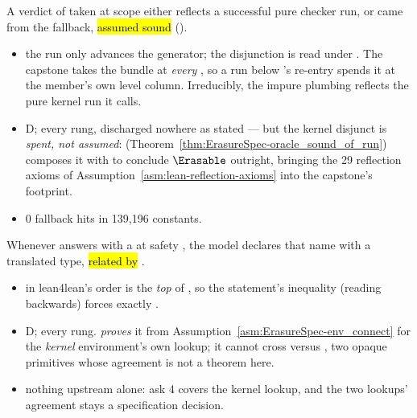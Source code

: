 \begin{assumption}
\label{asm:ErasureSpec-oracle_refl}
\leanok
{}
\stAssumed{}  A  verdict of  taken at scope
 either reflects a successful pure checker run, or came from the
 fallback, \hl{assumed sound} ().
\begin{itemize}
\item {} the run only advances the generator; the disjunction is read under
. The capstone takes the bundle at \emph{every} , so a run
below 's re-entry spends it at the member's own level column. Irreducibly, the
impure  plumbing reflects the pure kernel run it calls.
\item {} D;  every rung, discharged nowhere as stated --- but the kernel
disjunct is \emph{spent, not assumed}: 
(Theorem~\ref{thm:ErasureSpec-oracle_sound_of_run}) composes it with
 to conclude $\Erasable$ outright, bringing the 29
reflection axioms of Assumption~\ref{asm:lean-reflection-axioms} into the capstone's footprint.
\item {} 0 fallback hits in 139{,}196 constants.
\end{itemize}
\end{assumption}

\begin{assumption}
\label{asm:ErasureSpec-decl_adequate}
\leanok
{}
\stAssumed{}  Whenever  answers with a  at
safety , the model declares that name with a translated type, \hl{related by
}.
\begin{itemize}
\item {} in lean4lean's order  is the \emph{top} of
, so the statement's inequality (reading backwards) forces exactly
.
\item {} D;  every rung. 
\emph{proves} it from Assumption~\ref{asm:ErasureSpec-env_connect} for the \emph{kernel}
environment's own lookup; it cannot cross  versus
, two opaque primitives whose agreement is not a theorem here.
\item {} nothing upstream alone: ask 4 covers the kernel lookup, and
the two lookups' agreement stays a specification decision.
\end{itemize}
\end{assumption}

